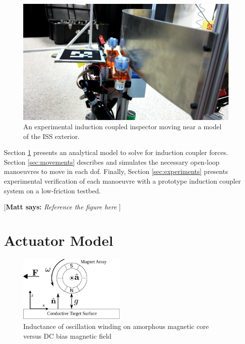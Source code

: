\documentclass[letterpaper, 10 pt, conference]{ieeeconf}  %
\newcommand{\matt}[1]{{\color{darkgreen}\small\par {[{\bf Matt says:} {\em #1}} ] \\    }}
\begin{document}
%
 \begin{figure}[thpb]
      \centering

      \includegraphics[width = 1.0\linewidth]{figures/screenshot.png}
      \caption{An experimental induction coupled inspector moving near a model of the ISS exterior.}
      \label{fig:realpicture}
   \end{figure}

Section \ref{sec:model} presents an analytical model to solve for induction coupler forces. Section \ref{sec:movements} describes and simulates the necessary open-loop manoeuvres to move in each dof. Finally, Section \ref{sec:experiments} presents experimental verification of each manoeuvre with a prototype induction coupler system on a low-friction testbed.
%

\matt{Reference the figure here }
  
\section{Actuator Model}
\label{sec:model}
 \begin{figure}[thpb]
      \centering

      \includegraphics[width = 0.47\textwidth]{figures/spin_mag_diagram.eps}
      \caption{Inductance of oscillation winding on amorphous
       magnetic core versus DC bias magnetic field}
      \label{A single induction coupler}
   \end{figure}
   
\end{document}
